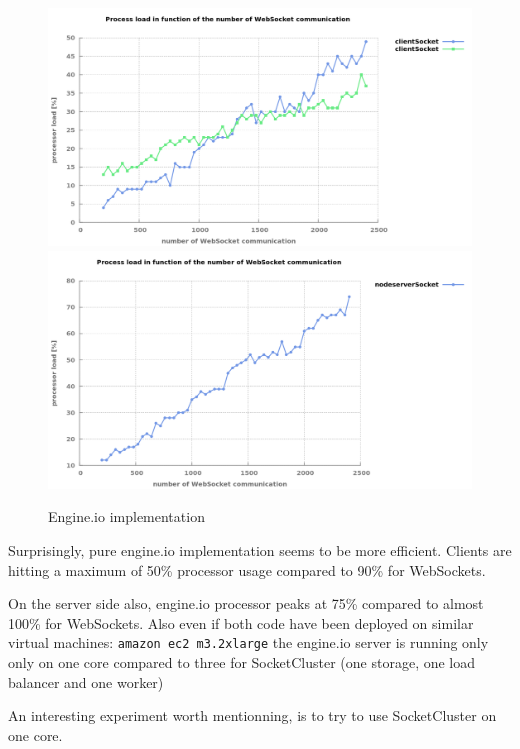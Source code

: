 \begin{figure}[H]
	\centering
		\includegraphics[width=\textwidth]{./Figures/engine_client_comparaison.png}
		\includegraphics[width=\textwidth]{./Figures/engine_server_comparaison.png}
	\caption[engine_comparaison]{Engine.io implementation}
	\label{fig:engine_comparaison}
\end{figure}

Surprisingly, pure engine.io implementation seems to be more efficient. Clients
are hitting a maximum of 50\% processor usage compared to 90\% for WebSockets.

On the server side also, engine.io processor peaks at 75\% compared to almost
100\% for WebSockets. Also even if both code have been deployed on similar
virtual machines: \texttt{amazon ec2 m3.2xlarge} the engine.io server is
running only only on one core compared to three for SocketCluster (one storage,
one load balancer and one worker)

An interesting experiment worth mentionning, is to try to use SocketCluster on
one core.


